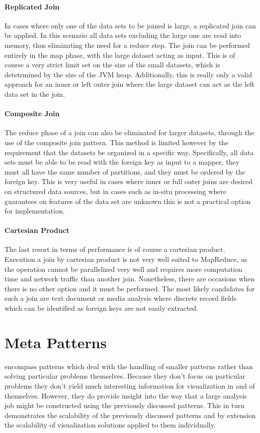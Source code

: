 \paragraph{Replicated Join}
In cases where only one of the data sets to be joined is large, a replicated join can be applied. In this scenario all data sets excluding the large one are read into memory, thus eliminating the need for a reduce step. The join can be performed entirely in the map phase, with the large dataset acting as input. This is of course a very strict limit set on the size of the small datasets, which is detetrmined by the size of the JVM heap. Additionally, this is really only a valid approach for an inner or left outer join where the large dataset can act as the left data set in the join. 

\paragraph{Composite Join}
The reduce phase of a join can also be eliminated for larger datasets, through the use of the composite join pattern. This method is limited however by the requirement that the datasets be organized in a specific way. Specifically, all data sets must be able to be read with the foreign key as input to a mapper, they must all have the same number of partitions, and they must be ordered by the foreign key. This is very useful in cases where inner or full outer joins are desired on structured data sources, but in cases such as in-situ processing where guarantees on features of the data set are unknown this is not a practical option for implementation.

\paragraph{Cartesian Product}
The last resort in terms of performance is of course a cartesian product. Execution a join by cartesian product is not very well suited to MapReduce, as the operation cannot be parallelized very well and requires more computation time and network traffic than another join. Nonetheless, there are occasions when there is no other option and it must be performed. The most likely candidates for such a join are text document or media analysis where discrete record fields which can be identified as foreign keys are not easily extracted. 

\section{Meta Patterns}
\label{sec:metapatterns}
 encompass patterns which deal with the handling of smaller patterns rather than solving particular problems themselves. Because they don't focus on particular problems they don't yield much interesting information for visualization in and of themselves. However, they do provide insight into the way that a large analysis job might be constructed using the previously discussed patterns. This in turn demonstrates the scalability of the previously discussed patterns and by extension the scalability of visualization solutions applied to them individually.

